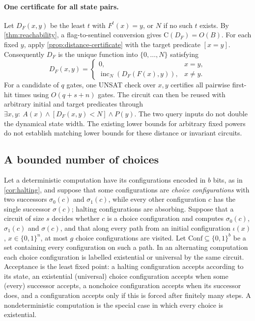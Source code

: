 \documentclass[11pt]{article}
\theoremstyle{definition}
\theoremstyle{remark}
\newcommand{\bits}{\{0,1\}}
\newcommand{\CC}{\mathrm{C}}
\numberwithin{equation}{section}
\begin{document}
\paragraph{One certificate for all state pairs.}
Let $D_F(x,y)$ be the least $t$ with $F^t(x)=y$, or $N$ if no such $t$
exists.  By \cref{thm:reachability}, a flag-to-sentinel conversion gives
$\CC(D_F)=O(B)$.  For each fixed $y$, apply
\cref{prop:distance-certificate} with the target predicate $[x=y]$.
Consequently $D_F$ is the unique function into $\{0,\ldots,N\}$ satisfying
\begin{equation}\label{eq:pair-distance-certificate}
 D_F(x,y)=
 \begin{cases}
  0,&x=y,\\
  \operatorname{inc}_N(D_F(F(x),y)),&x\ne y.
 \end{cases}
\end{equation}
For a candidate of $q$ gates, one UNSAT check over $x,y$ certifies all
pairwise first-hit times using $O(q+s+n)$ gates.  The circuit can then be reused with arbitrary
initial and target predicates through
$\exists x,y:\ A(x)\land[D_F(x,y)<N]\land P(y)$.
The two query inputs do not double the dynamical state width.
The existing lower bounds for arbitrary fixed powers do not establish
matching lower bounds for these distance or invariant circuits.

\subsection{A bounded number of choices}\label{sec:bounded-choice}

Let a deterministic computation have its configurations encoded in $b$
bits, as in \cref{cor:halting}, and suppose that some configurations are
\emph{choice configurations} with two successors $\sigma_0(c)$ and
$\sigma_1(c)$, while every other configuration $c$ has the single successor
$\sigma(c)$; halting configurations are absorbing.  Suppose that a circuit
of size $s$ decides whether $c$ is a choice configuration and computes
$\sigma_0(c)$, $\sigma_1(c)$ and $\sigma(c)$, and that along every path from
an initial configuration $\iota(x)$, $x\in\bits^n$, at most $g$ choice
configurations are visited.  Let $\mathrm{Conf}\subseteq\bits^b$ be a set
containing every configuration on such a path.  In an alternating
computation each choice configuration is labelled existential or
universal by the same circuit.  Acceptance is the least fixed point:
a halting configuration accepts according to its state, an existential
(universal) choice configuration accepts when some (every) successor
accepts, a nonchoice configuration accepts when its successor does, and
a configuration accepts only if this is forced after finitely many
steps.  A nondeterministic computation is the special case in which
every choice is existential.
\end{document}
